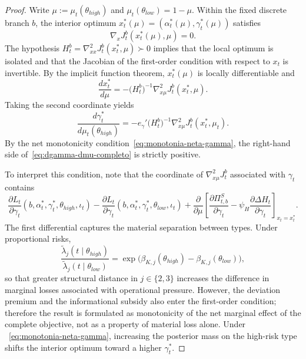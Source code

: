 \documentclass[ecta,nameyear,final,supplement]{econsocart}
\numberwithin{equation}{section}
\numberwithin{table}{section}
\theoremstyle{definition}
\begin{document}
\begin{proof}
Write $\mu:=\mu_t(\theta_{high})$ and
$\mu_t(\theta_{low})=1-\mu$. Within the fixed discrete branch $b$, the interior
optimum $x_t^\ast(\mu)=(\alpha_t^\ast(\mu),\gamma_t^\ast(\mu))$ satisfies
\begin{equation}
\label{eq:foc-rama-completa}
\nabla_x J_t^b(x_t^\ast(\mu),\mu)=0.
\end{equation}
The hypothesis $H_t^b=\nabla_{xx}^2J_t^b(x_t^\ast,\mu)\succ0$ implies that the
local optimum is isolated and that the Jacobian of the first-order condition
with respect to $x_t$ is invertible. By the implicit function theorem,
$x_t^\ast(\mu)$ is locally differentiable and
\begin{equation}
\label{eq:dx-dmu-completo}
\frac{d x_t^\ast}{d\mu}
=
-\bigl(H_t^b\bigr)^{-1}\nabla_{x\mu}^2J_t^b(x_t^\ast,\mu).
\end{equation}
Taking the second coordinate yields
\begin{equation}
\label{eq:dgamma-dmu-completo}
\frac{d\gamma_t^\ast}{d\mu_t(\theta_{high})}
=
-e_\gamma'
\bigl(H_t^b\bigr)^{-1}
\nabla_{x\mu}^2J_t^b(x_t^\ast,\mu_t).
\end{equation}
By the net monotonicity condition~\eqref{eq:monotonia-neta-gamma}, the right-hand
side of~\eqref{eq:dgamma-dmu-completo} is strictly positive.

To interpret this condition, note that the coordinate of
$\nabla_{x\mu}^2J_t^b$ associated with $\gamma_t$ contains
\begin{equation}
\label{eq:efecto-neto-gamma}
\frac{\partial L_t}{\partial\gamma_t}
(b,\alpha_t^\ast,\gamma_t^\ast,\theta_{high},\iota_t)
-
\frac{\partial L_t}{\partial\gamma_t}
(b,\alpha_t^\ast,\gamma_t^\ast,\theta_{low},\iota_t)
+
\frac{\partial}{\partial\mu}
\left[
\frac{\partial \Pi_{t,b}^{S}}{\partial\gamma_t}
-\psi_H
\frac{\partial \Delta H_t}{\partial\gamma_t}
\right]_{x_t=x_t^\ast}.
\end{equation}
The first differential captures the material separation between types. Under
proportional risks,
\[
\frac{\tilde\lambda_j(t\mid\theta_{high})}
     {\tilde\lambda_j(t\mid\theta_{low})}
=
\exp\!\bigl(\beta_{K,j}(\theta_{high})
-\beta_{K,j}(\theta_{low})\bigr),
\]
so that greater structural distance in $j\in\{2,3\}$ increases the difference
in marginal losses associated with operational pressure. However, the deviation
premium and the informational subsidy also enter the first-order condition;
therefore the result is formulated as monotonicity of the net marginal effect
of the complete objective, not as a property of material loss alone. Under
~\eqref{eq:monotonia-neta-gamma}, increasing the posterior mass on the
high-risk type shifts the interior optimum toward a higher $\gamma_t^\ast$.
\end{proof}
\end{document}
